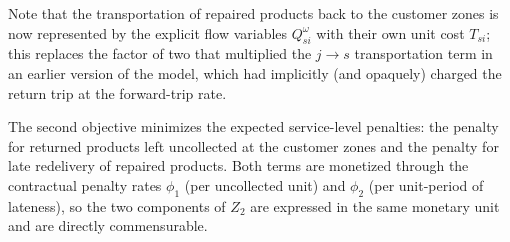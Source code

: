\documentclass[11pt, a4paper]{article}
\begin{document}
Note that the transportation of repaired products back to the customer zones is now represented by the explicit flow variables $Q_{si}^{\omega}$ with their own unit cost $T_{si}$; this replaces the factor of two that multiplied the $j \rightarrow s$ transportation term in an earlier version of the model, which had implicitly (and opaquely) charged the return trip at the forward-trip rate.

The second objective minimizes the expected service-level penalties: the penalty for returned products left uncollected at the customer zones and the penalty for late redelivery of repaired products. Both terms are monetized through the contractual penalty rates $\phi_1$ (per uncollected unit) and $\phi_2$ (per unit-period of lateness), so the
two components of $Z_2$ are expressed in the same monetary unit and are directly commensurable.
\end{document}
